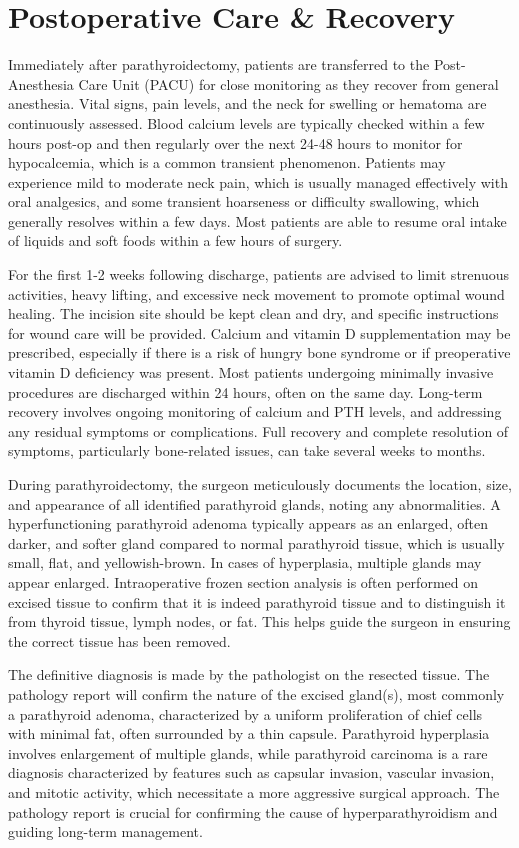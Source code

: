 \section*{Postoperative Care \& Recovery}
Immediately after parathyroidectomy, patients are transferred to the Post-Anesthesia Care Unit (PACU) for close monitoring as they recover from general anesthesia. Vital signs, pain levels, and the neck for swelling or hematoma are continuously assessed. Blood calcium levels are typically checked within a few hours post-op and then regularly over the next 24-48 hours to monitor for hypocalcemia, which is a common transient phenomenon. Patients may experience mild to moderate neck pain, which is usually managed effectively with oral analgesics, and some transient hoarseness or difficulty swallowing, which generally resolves within a few days. Most patients are able to resume oral intake of liquids and soft foods within a few hours of surgery.

For the first 1-2 weeks following discharge, patients are advised to limit strenuous activities, heavy lifting, and excessive neck movement to promote optimal wound healing. The incision site should be kept clean and dry, and specific instructions for wound care will be provided. Calcium and vitamin D supplementation may be prescribed, especially if there is a risk of hungry bone syndrome or if preoperative vitamin D deficiency was present. Most patients undergoing minimally invasive procedures are discharged within 24 hours, often on the same day. Long-term recovery involves ongoing monitoring of calcium and PTH levels, and addressing any residual symptoms or complications. Full recovery and complete resolution of symptoms, particularly bone-related issues, can take several weeks to months.

During parathyroidectomy, the surgeon meticulously documents the location, size, and appearance of all identified parathyroid glands, noting any abnormalities. A hyperfunctioning parathyroid adenoma typically appears as an enlarged, often darker, and softer gland compared to normal parathyroid tissue, which is usually small, flat, and yellowish-brown. In cases of hyperplasia, multiple glands may appear enlarged. Intraoperative frozen section analysis is often performed on excised tissue to confirm that it is indeed parathyroid tissue and to distinguish it from thyroid tissue, lymph nodes, or fat. This helps guide the surgeon in ensuring the correct tissue has been removed.

The definitive diagnosis is made by the pathologist on the resected tissue. The pathology report will confirm the nature of the excised gland(s), most commonly a parathyroid adenoma, characterized by a uniform proliferation of chief cells with minimal fat, often surrounded by a thin capsule. Parathyroid hyperplasia involves enlargement of multiple glands, while parathyroid carcinoma is a rare diagnosis characterized by features such as capsular invasion, vascular invasion, and mitotic activity, which necessitate a more aggressive surgical approach. The pathology report is crucial for confirming the cause of hyperparathyroidism and guiding long-term management.

